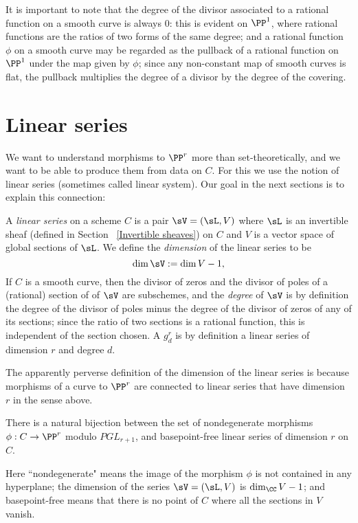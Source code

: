 It is important to note that the degree of the divisor associated to a rational function on a smooth curve is always 0: this is evident on $\PP^1$, where rational 
functions are the ratios of two forms of the same degree; and a rational function $\phi$ on a smooth curve may be regarded as the pullback of a rational function
on $\PP^1$ under the map given by $\phi$; since any non-constant map of smooth curves is flat, the pullback multiplies the degree of a divisor by the degree 
of the covering. 

\section{Linear series}

We want to understand morphisms to $\PP^r$ more than set-theoretically, and we want to be able to produce them from data on $C$. For this we use the notion of linear series (sometimes called linear system). Our goal in the next sections is to explain this connection:

\begin{definition}
 A \emph{linear series} on a scheme $C$ is a pair $\sV  = (\sL, V)$ where $\sL$ is an invertible sheaf (defined in Section ~\ref{Invertible sheaves}) on $C$ and
 $V$ is a vector space of global sections of $\sL$. We define the \emph{dimension} of the linear series to be 
 $$
 \dim \sV := \dim V -1,
 $$
 If $C$ is a smooth curve, then the divisor of zeros and the divisor of poles of a (rational) section of of $\sV$ are subschemes, and the \emph{degree} of $\sV$ is by definition the degree of the divisor of poles minus the degree of the divisor of zeros of any of its sections; since the 
 ratio of two sections is a rational function, this is independent of the section chosen. A $g^r_d$ is by definition a linear series
 of dimension $r$ and degree $d$.
\end{definition}

The apparently perverse definition of the dimension of the linear series is because morphisms of a curve to $\PP^r$ are connected to linear series that have dimension $r$ in the sense above.

\begin{theorem}\label{morphisms and linear series}
There is a natural bijection between the set of nondegenerate morphisms $\phi : C \to \PP^r$ modulo $PGL_{r+1}$, and basepoint-free linear series of dimension $r$ on $C$.\end{theorem}

Here ``nondegenerate" means the image of the morphism $\phi$ is not contained in any hyperplane; the dimension of the series
 $\sV  = (\sL, V)$ is $\dim_\CC V -1$; and basepoint-free means that there is no point of $C$ where all the sections in $V$
vanish.

